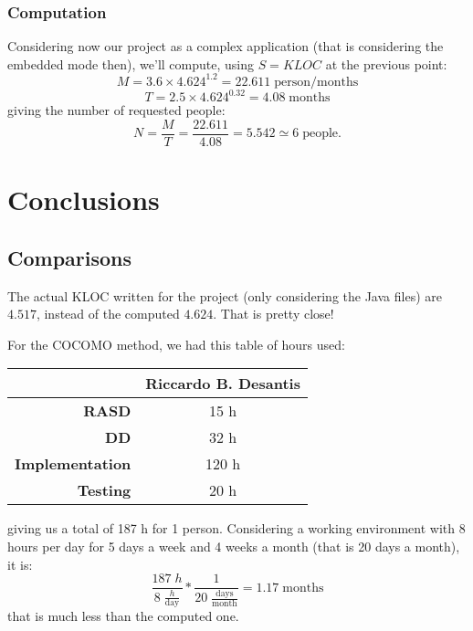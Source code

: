 \documentclass[a4paper,12pt]{book}
\begin{document}
\subsection{Computation}
Considering now our project as a complex application (that is considering the embedded mode then), we'll compute, using $S=KLOC$ at the previous point:
\[
  M = 3.6 \times {4.624}^{1.2} = 22.611 \; \text{person}/\text{months}
\]
\[
  T = 2.5 \times {4.624}^{0.32} = 4.08 \; \text{months}
\]
giving the number of requested people:
\[
  N = \frac{M}{T} = \frac{22.611}{4.08} = 5.542 \simeq 6 \;\text{people}.
\]

\chapter{Conclusions}

\section{Comparisons}
The actual KLOC written for the project (only considering the Java files) are $4.517$, instead of the computed $4.624$. That is pretty close!\newline

For the COCOMO method, we had this table of hours used:
\begin{center}
  \begin{tabular}{ | r | c |}
    \hline
    & \textbf{Riccardo B. Desantis} \\ \hline
    \textbf{RASD} & 15 h \\ \hline
    \textbf{DD} & 32 h \\ \hline
    \textbf{Implementation} & 120 h \\ \hline
    \textbf{Testing} & 20 h \\ \hline    
  \end{tabular}
\end{center}
giving us a total of 187 h for 1 person. Considering a working environment with 8 hours per day for 5 days a week and 4 weeks a month (that is 20 days a month), it is:
\[
  \frac{187 \; h}{8 \; \frac{h}{\text{day}}} * \frac{1}{20 \; \frac{\text{days}}{\text{month}} } = 1.17 \; \text{months}
\]
that is much less than the computed one.
\end{document}
